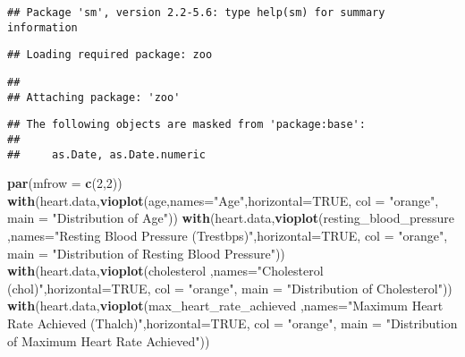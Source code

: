 \documentclass[]{article}
\newenvironment{Shaded}{\begin{snugshade}}{\end{snugshade}}
\newcommand{\DataTypeTok}[1]{\textcolor[rgb]{0.13,0.29,0.53}{#1}}
\newcommand{\DecValTok}[1]{\textcolor[rgb]{0.00,0.00,0.81}{#1}}
\newcommand{\KeywordTok}[1]{\textcolor[rgb]{0.13,0.29,0.53}{\textbf{#1}}}
\newcommand{\NormalTok}[1]{#1}
\newcommand{\OtherTok}[1]{\textcolor[rgb]{0.56,0.35,0.01}{#1}}
\newcommand{\StringTok}[1]{\textcolor[rgb]{0.31,0.60,0.02}{#1}}
\begin{document}
\begin{verbatim}
## Package 'sm', version 2.2-5.6: type help(sm) for summary information
\end{verbatim}

\begin{verbatim}
## Loading required package: zoo
\end{verbatim}

\begin{verbatim}
## 
## Attaching package: 'zoo'
\end{verbatim}

\begin{verbatim}
## The following objects are masked from 'package:base':
## 
##     as.Date, as.Date.numeric
\end{verbatim}

\begin{Shaded}
\begin{Highlighting}[]
\KeywordTok{par}\NormalTok{(}\DataTypeTok{mfrow =} \KeywordTok{c}\NormalTok{(}\DecValTok{2}\NormalTok{,}\DecValTok{2}\NormalTok{))}
\KeywordTok{with}\NormalTok{(heart.data,}\KeywordTok{vioplot}\NormalTok{(age,}\DataTypeTok{names=}\StringTok{"Age"}\NormalTok{,}\DataTypeTok{horizontal=}\OtherTok{TRUE}\NormalTok{, }\DataTypeTok{col =} \StringTok{"orange"}\NormalTok{, }\DataTypeTok{main =} \StringTok{"Distribution of Age"}\NormalTok{))}
\KeywordTok{with}\NormalTok{(heart.data,}\KeywordTok{vioplot}\NormalTok{(resting_blood_pressure  ,}\DataTypeTok{names=}\StringTok{"Resting Blood Pressure (Trestbps)"}\NormalTok{,}\DataTypeTok{horizontal=}\OtherTok{TRUE}\NormalTok{, }\DataTypeTok{col =} \StringTok{"orange"}\NormalTok{, }\DataTypeTok{main =} \StringTok{"Distribution of Resting Blood Pressure"}\NormalTok{))}
\KeywordTok{with}\NormalTok{(heart.data,}\KeywordTok{vioplot}\NormalTok{(cholesterol ,}\DataTypeTok{names=}\StringTok{"Cholesterol  (chol)"}\NormalTok{,}\DataTypeTok{horizontal=}\OtherTok{TRUE}\NormalTok{, }\DataTypeTok{col =} \StringTok{"orange"}\NormalTok{, }\DataTypeTok{main =} \StringTok{"Distribution of Cholesterol"}\NormalTok{))}
\KeywordTok{with}\NormalTok{(heart.data,}\KeywordTok{vioplot}\NormalTok{(max_heart_rate_achieved  ,}\DataTypeTok{names=}\StringTok{"Maximum Heart Rate Achieved (Thalch)"}\NormalTok{,}\DataTypeTok{horizontal=}\OtherTok{TRUE}\NormalTok{, }\DataTypeTok{col =} \StringTok{"orange"}\NormalTok{, }\DataTypeTok{main =} \StringTok{"Distribution of Maximum Heart Rate Achieved"}\NormalTok{))}
\end{Highlighting}
\end{Shaded}
\end{document}
